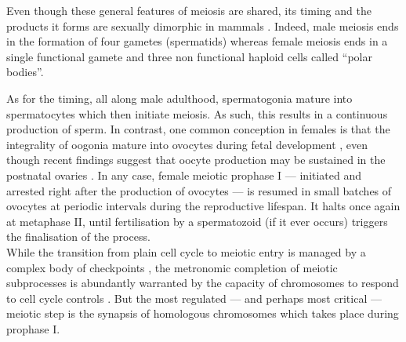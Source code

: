 


Even though these general features of meiosis are shared, its timing and the products it forms are sexually dimorphic in mammals \citep[reviewed in][]{handel2010genetics}. 
Indeed, male meiosis ends in the formation of four gametes (spermatids) whereas female meiosis ends in a single functional gamete and three non functional haploid cells called “polar bodies”.

As for the timing, all along male adulthood, spermatogonia mature into spermatocytes which then initiate meiosis. As such, this results in a continuous production of sperm.
In contrast, one common conception in females is that the integrality of oogonia mature into ovocytes during fetal development \citep{pearl1921studies,zuckerman1951number}, even though recent findings suggest that oocyte production may be sustained in the postnatal ovaries \citep{johnson2004germline,johnson2005oocyte}.
In any case, female meiotic prophase I — initiated and arrested right after the production of ovocytes — is resumed in small batches of ovocytes at periodic intervals during the reproductive lifespan.
It halts once again at metaphase II, until fertilisation by a spermatozoid (if it ever occurs) triggers the finalisation of the process.\\

While the transition from plain cell cycle to meiotic entry is managed by a complex body of checkpoints \citep[reviewed in][]{marston2005meiosis}, the metronomic completion of meiotic subprocesses is abundantly warranted by the capacity of chromosomes to respond to cell cycle controls \citep[reviewed in][]{mckim1995chromosomal}.
But the most regulated — and perhaps most critical — meiotic step is the synapsis of homologous chromosomes which takes place during prophase I.



